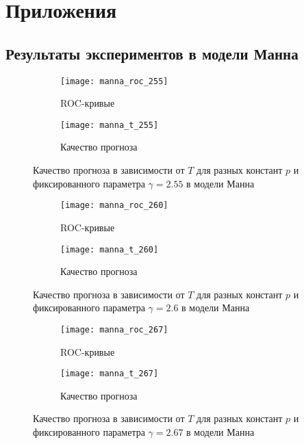 \section*{Приложения}


\renewcommand{\thesubsection}{\Alph{subsection}}

\subsection{Результаты экспериментов в модели Манна}\label{appendix:a}

\begin{figure}[h]
	\centering
	\hspace{-20mm}
	\begin{subfigure}[t]{0.4\textwidth}
		\texttt{[image: manna\_roc\_255]} 
		\caption{ROC-кривые}
	\end{subfigure}
	\hspace*{10mm}
	\begin{subfigure}[t]{0.4\textwidth}
		\texttt{[image: manna\_t\_255]} 
		\caption{Качество прогноза}
	\end{subfigure}
	\caption{Качество прогноза в зависимости от $T$ для разных констант $p$ и фиксированного параметра $\gamma=2.55$ в модели Манна}
\end{figure}

\begin{figure}[h]
	\centering
	\hspace{-20mm}
	\begin{subfigure}[t]{0.4\textwidth}
		\texttt{[image: manna\_roc\_260]} 
		\caption{ROC-кривые}
	\end{subfigure}
	\hspace*{10mm}
	\begin{subfigure}[t]{0.4\textwidth}
		\texttt{[image: manna\_t\_260]} 
		\caption{Качество прогноза}
	\end{subfigure}
	\caption{Качество прогноза в зависимости от $T$ для разных констант $p$ и фиксированного параметра $\gamma=2.6$ в модели Манна}
\end{figure}

\begin{figure}[h]
	\centering
	\hspace{-20mm}
	\begin{subfigure}[t]{0.4\textwidth}
		\texttt{[image: manna\_roc\_267]} 
		\caption{ROC-кривые}
	\end{subfigure}
	\hspace*{10mm}
	\begin{subfigure}[t]{0.4\textwidth}
		\texttt{[image: manna\_t\_267]} 
		\caption{Качество прогноза}
	\end{subfigure}
	\caption{Качество прогноза в зависимости от $T$ для разных констант $p$ и фиксированного параметра $\gamma=2.67$ в модели Манна}
\end{figure}


